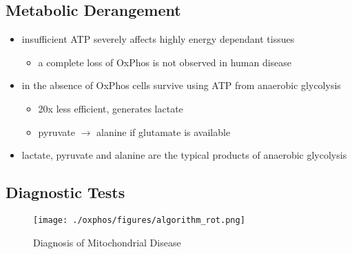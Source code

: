 \documentclass{scrartcl}
\begin{document}
\subsection{Metabolic Derangement}
\label{sec:orgf6c9ec3}
\begin{itemize}
\item insufficient ATP severely affects highly energy dependant tissues
\begin{itemize}
\item a complete loss of OxPhos is not observed in human disease
\end{itemize}
\item in the absence of OxPhos cells survive using ATP from anaerobic glycolysis
\begin{itemize}
\item 20x less efficient, generates lactate
\item pyruvate \(\to\) alanine if glutamate is available
\end{itemize}
\item lactate, pyruvate and alanine are the typical products of anaerobic glycolysis
\end{itemize}

\subsection{Diagnostic Tests}
\label{sec:org66ac903}

\begin{figure}[htbp]
\centering
\texttt{[image: ./oxphos/figures/algorithm\_rot.png]}
\caption{\label{fig:org5774246}
Diagnosis of Mitochondrial Disease}
\end{figure}
\end{document}
